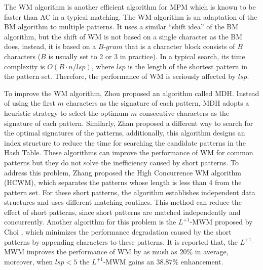 \documentclass{article}
\begin{document}
The \textsf{WM} algorithm is another efficient algorithm for MPM which
is known to be faster than \textsf{AC} in a typical matching. The
\textsf{WM} algorithm is an adaptation of the \textsf{BM} algorithm to
multiple patterns. It uses a similar ``shift idea'' of the \textsf{BM}
algorithm, but the shift of \textsf{WM} is not based on a single
character as the \textsf{BM} does, instead, it is based on a
$B$-$gram$ that is a character block consists of $B$ characters ($B$
is usually set to 2 or 3 in practice). In a typical search, its time
complexity is $O(B \cdot n/lsp)$, where $lsp$ is the length of the
shortest pattern in the pattern set. Therefore, the performance of WM
is seriously affected by $lsp$.

To improve the \textsf{WM} algorithm, Zhou \cite{Zhou2007} proposed an
algorithm called \textsf{MDH}. Instead of using the first $m$
characters as the signature of each pattern, \textsf{MDH} adopts a
heuristic strategy to select the optimum $m$ consecutive characters as
the signature of each pattern. Similarly, Zhan \cite{Zhan2014}
proposed a different way to search for the optimal signatures of the
patterns, additionally, this algorithm designs an index structure to
reduce the time for searching the candidate patterns in the Hash
Table. These algorithms can improve the performance of \textsf{WM} for
common patterns but they do not solve the inefficiency caused by short
patterns. To address this problem, Zhang \cite{Zhang2009} proposed the
High Concurrence WM algorithm (\textsf{HCWM}), which separates the
patterns whose length is less than 4 from the pattern set. For these
short patterns, the algorithm establishes independent data structures
and uses different matching routines. This method can reduce the
effect of short patterns, since short patterns are matched
independently and concurrently. Another algorithm for this problem is
the \textsf{$L^{+1}$-MWM} proposed by Choi \cite{Choi2011}, which
minimizes the performance degradation caused by the short patterns by
appending characters to these patterns. It is reported that, the
\textsf{$L^{+1}$-MWM} improves the performance of WM by as mush as
$20\%$ in average, moreover, when $lsp < 5$ the \textsf{$L^{+1}$-MWM}
gains an $38.87\%$ enhancement.
\end{document}
